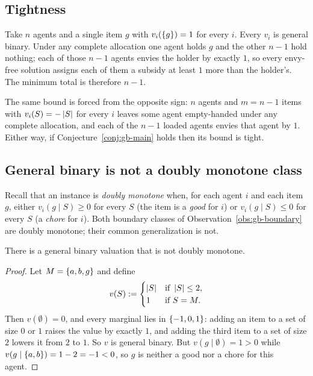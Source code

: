 \subsection{Tightness}
\label{sec:gb-tightness}

\begin{example}
\label{ex:gb-lowerbound}
Take $n$ agents and a single item $g$ with $v_i(\left\{g\right\}) = 1$ for every $i$.
Every $v_i$ is general binary. Under any complete allocation one agent holds
$g$ and the other $n-1$ hold nothing; each of those $n-1$ agents envies the
holder by exactly $1$, so every envy-free solution assigns each of them a
subsidy at least $1$ more than the holder's. The minimum total is therefore
$n-1$.
\end{example}

The same bound is forced from the opposite sign: $n$ agents and $m = n-1$ items
with $v_i(S) = -\left\lvert S\right\rvert$ for every $i$ leaves some agent empty-handed under any
complete allocation, and each of the $n-1$ loaded agents envies that agent by
$1$. Either way, if Conjecture~\ref{conj:gb-main} holds then its bound is
tight.

\subsection{General binary is not a doubly monotone class}
\label{sec:gb-not-doubly-monotone}

Recall that an instance is \emph{doubly monotone} when, for each agent $i$ and
each item $g$, either $v_i(g \mid S) \ge 0$ for every $S$ (the item is a
\emph{good} for $i$) or $v_i(g \mid S) \le 0$ for every $S$ (a \emph{chore}
for $i$). Both boundary classes of Observation~\ref{obs:gb-boundary} are
doubly monotone; their common generalization is not.

\begin{lemma}
\label{lem:gb-not-doubly-monotone}
There is a general binary valuation that is not doubly monotone.
\end{lemma}

\begin{proof}
Let $M = \left\{a,b,g\right\}$ and define
\[
  v(S) := \begin{cases} \left\lvert S\right\rvert & \text{if } \left\lvert S\right\rvert \le 2,\\ 1 & \text{if } S = M. \end{cases}
\]
Then $v(\emptyset) = 0$, and every marginal lies in $\left\{-1,0,1\right\}$: adding an
item to a set of size $0$ or $1$ raises the value by exactly $1$, and adding
the third item to a set of size $2$ lowers it from $2$ to $1$. So $v$ is
general binary. But $v(g \mid \emptyset) = 1 > 0$ while
$v(g \mid \left\{a,b\right\}) = 1 - 2 = -1 < 0$, so $g$ is neither a good nor a chore
for this agent.
\end{proof}

